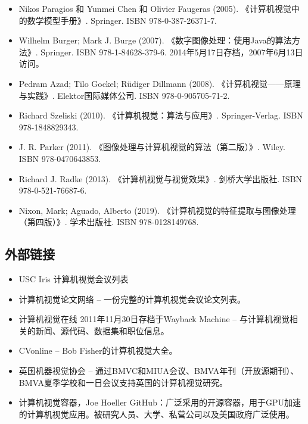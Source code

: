 \begin{itemize}
\item Nikos Paragios 和 Yunmei Chen 和 Olivier Faugeras (2005). 《计算机视觉中的数学模型手册》. Springer. ISBN 978-0-387-26371-7.  
\item Wilhelm Burger; Mark J. Burge (2007). 《数字图像处理：使用Java的算法方法》. Springer. ISBN 978-1-84628-379-6. 2014年5月17日存档，2007年6月13日访问。  
\item Pedram Azad; Tilo Gockel; Rüdiger Dillmann (2008). 《计算机视觉——原理与实践》. Elektor国际媒体公司. ISBN 978-0-905705-71-2.  
\item Richard Szeliski (2010). 《计算机视觉：算法与应用》. Springer-Verlag. ISBN 978-1848829343.  
\item J. R. Parker (2011). 《图像处理与计算机视觉的算法（第二版）》. Wiley. ISBN 978-0470643853.  
\item Richard J. Radke (2013). 《计算机视觉与视觉效果》. 剑桥大学出版社. ISBN 978-0-521-76687-6.  
\item Nixon, Mark; Aguado, Alberto (2019). 《计算机视觉的特征提取与图像处理（第四版）》. 学术出版社. ISBN 978-0128149768.
\end{itemize}
\subsection{外部链接}  
\begin{itemize}
\item USC Iris 计算机视觉会议列表  
\item 计算机视觉论文网络 – 一份完整的计算机视觉会议论文列表。  
\item 计算机视觉在线 2011年11月30日存档于Wayback Machine – 与计算机视觉相关的新闻、源代码、数据集和职位信息。  
\item CVonline – Bob Fisher的计算机视觉大全。  
\item 英国机器视觉协会 – 通过BMVC和MIUA会议、BMVA年刊（开放源期刊）、BMVA夏季学校和一日会议支持英国的计算机视觉研究。  
\item 计算机视觉容器，Joe Hoeller GitHub：广泛采用的开源容器，用于GPU加速的计算机视觉应用。被研究人员、大学、私营公司以及美国政府广泛使用。
\end{itemize}